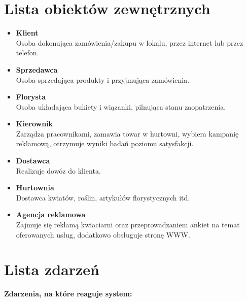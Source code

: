 \documentclass[a4paper,12pt]{article}
\begin{document}
	\section{Lista obiektów zewnętrznych}
	\begin{itemize}
		\setlength\itemsep{1em}
		\item \textbf{\large{Klient}}\\
		Osoba dokonująca zamówienia/zakupu w lokalu, przez internet lub przez telefon.
		\item \textbf{\large{Sprzedawca}}\\
		Osoba sprzedająca produkty i przyjmująca zamówienia. 
		\item \textbf{\large{Florysta}}\\
		Osoba układająca bukiety i wiązanki, pilnująca stanu zaopatrzenia.
		\item \textbf{\large{Kierownik}}\\
		Zarządza pracownikami, zamawia towar w hurtowni, wybiera kampanię reklamową, otrzymuje wyniki badań poziomu satysfakcji.
		\item \textbf{\large{Dostawca}}\\
		Realizuje dowóz do klienta.
		\item \textbf{\large{Hurtownia}}\\
		Dostawca kwiatów, roślin, artykułów florystycznych itd.
		\item \textbf{\large{Agencja reklamowa}}\\
		Zajmuje się reklamą kwiaciarni oraz przeprowadzaniem ankiet na temat oferowanych usług, dodatkowo obsługuje stronę WWW.
	\end{itemize}
	\newpage
	
	\section{Lista zdarzeń}
    \textbf{Zdarzenia, na które reaguje system: }
    
\end{document}
